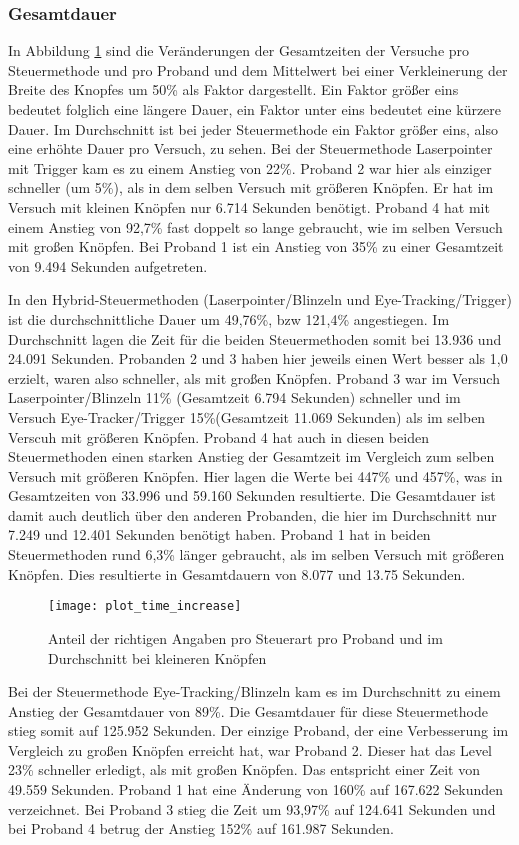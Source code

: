 \subsubsection{Gesamtdauer}
In Abbildung \ref{fig:timesIncrease} sind die Veränderungen der Gesamtzeiten der Versuche pro Steuermethode und pro Proband und dem Mittelwert bei einer Verkleinerung der Breite des Knopfes um 50\% als Faktor dargestellt. Ein Faktor größer eins bedeutet folglich eine längere Dauer, ein Faktor unter eins bedeutet eine kürzere Dauer. Im Durchschnitt ist bei jeder Steuermethode ein Faktor größer eins, also eine erhöhte Dauer pro Versuch, zu sehen. Bei der Steuermethode Laserpointer mit Trigger kam es zu einem Anstieg von 22\%. Proband 2 war hier als einziger schneller (um 5\%), als in dem selben Versuch mit größeren Knöpfen. Er hat im Versuch mit kleinen Knöpfen nur 6.714 Sekunden benötigt. Proband 4 hat mit einem Anstieg von 92,7\% fast doppelt so lange gebraucht, wie im selben Versuch mit großen Knöpfen. Bei Proband 1 ist ein Anstieg von 35\% zu einer Gesamtzeit von 9.494 Sekunden aufgetreten.

In den Hybrid-Steuermethoden (Laserpointer/Blinzeln und Eye-Tracking/Trigger) ist die durchschnittliche Dauer um 49,76\%, bzw 121,4\% angestiegen. Im Durchschnitt lagen die Zeit für die beiden Steuermethoden somit bei 13.936  und 24.091 Sekunden. Probanden 2 und 3 haben hier jeweils einen Wert besser als 1,0 erzielt, waren also schneller, als mit großen Knöpfen. Proband 3 war im Versuch Laserpointer/Blinzeln 11\% (Gesamtzeit 6.794 Sekunden) schneller und im Versuch Eye-Tracker/Trigger 15\%(Gesamtzeit 11.069 Sekunden) als im selben Verscuh mit größeren Knöpfen. Proband 4 hat auch in diesen beiden Steuermethoden einen starken Anstieg der Gesamtzeit im Vergleich zum selben Versuch mit größeren Knöpfen. Hier lagen die Werte bei 447\% und 457\%, was in Gesamtzeiten von 33.996 und 59.160 Sekunden resultierte. Die Gesamtdauer ist damit auch deutlich über den anderen Probanden, die hier im Durchschnitt nur 7.249 und 12.401 Sekunden benötigt haben. Proband 1 hat in beiden Steuermethoden rund 6,3\% länger gebraucht, als im selben Versuch mit größeren Knöpfen. Dies resultierte in Gesamtdauern von 8.077 und 13.75 Sekunden. 
\begin{figure}[!htbp]
	\centering
	\texttt{[image: plot\_time\_increase]}
	\caption[Anteil der richtigen Angaben pro Steuerart pro Proband und im Durchschnitt bei kleineren Knöpfen]{Anteil der richtigen Angaben pro Steuerart pro Proband und im Durchschnitt bei kleineren Knöpfen}
	\label{fig:timesIncrease}
\end{figure}
Bei der Steuermethode Eye-Tracking/Blinzeln kam es im Durchschnitt zu einem Anstieg der Gesamtdauer von 89\%. Die Gesamtdauer für diese Steuermethode stieg somit auf 125.952 Sekunden. Der einzige Proband, der eine Verbesserung im Vergleich zu großen Knöpfen erreicht hat, war Proband 2. Dieser hat das Level 23\% schneller erledigt, als mit großen Knöpfen. Das entspricht einer Zeit von 49.559 Sekunden. Proband 1 hat eine Änderung von 160\% auf 167.622 Sekunden verzeichnet. Bei Proband 3 stieg die Zeit um 93,97\% auf 124.641 Sekunden und bei Proband 4 betrug der Anstieg 152\% auf 161.987 Sekunden. 

